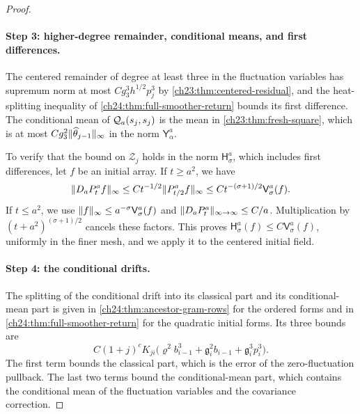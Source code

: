 \begin{proof}
\paragraph{Step 3: higher-degree remainder, conditional means, and first differences.} The centered remainder of degree at least three in the fluctuation variables has supremum norm at most $Cg_3^3h^{1/2}p_j^3$ by \cref{ch23:thm:centered-residual}, and the heat-splitting inequality of \cref{ch24:thm:full-smoother-return} bounds its first difference. The conditional mean of $\mathcal Q_{a}(s_j,s_j)$ is the mean in \cref{ch23:thm:fresh-square}, which is at most $Cg_3^2\lVert \widehat\theta_{j-1}\rVert_\infty$ in the norm $\mathsf Y_\alpha^a$.

To verify that the bound on $\mathcal Z_j$ holds in the norm $\mathsf H_\sigma^a$, which includes first differences, let $f$ be an initial array. If $t\ge a^2$, we have
\[
 \lVert D_aP_t^af\rVert_\infty\le Ct^{-1/2}\lVert P_{t/2}^af\rVert_\infty\le Ct^{-(\sigma+1)/2}\mathsf V_\sigma^a(f).
\]
If $t\le a^2$, we use $\lVert f\rVert_\infty\le a^{-\sigma}\mathsf V_\sigma^a(f)$ and $\lVert D_aP_t^a\rVert_{\infty\to\infty}\le C/a$. Multiplication by $(t+a^2)^{(\sigma+1)/2}$ cancels these factors. This proves $\mathsf H_\sigma^a(f)\le C\mathsf V_\sigma^a(f)$, uniformly in the finer mesh, and we apply it to the centered initial field.

\paragraph{Step 4: the conditional drifts.} The splitting of the conditional drift into its classical part and its conditional-mean part is given in \cref{ch24:thm:ancestor-gram-rows} for the ordered forms and in \cref{ch24:thm:full-smoother-return} for the quadratic initial forms. Its three bounds are
\[
 C(1+j)^cK_{ji}\bigl(\varrho^2b_{i-1}^3+\mathfrak g_i^2b_{i-1}+\mathfrak g_i^3p_i^3\bigr).
\]
The first term bounds the classical part, which is the error of the zero-fluctuation pullback. The last two terms bound the conditional-mean part, which contains the conditional mean of the fluctuation variables and the covariance correction.


\end{proof}
